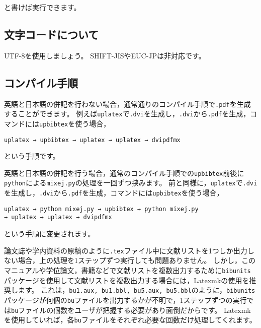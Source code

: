 \documentclass[10pt, a4paper, dvipdfmx, uplatex]{jsarticle} %
\begin{document}
\noindent\makebox[\linewidth]{\rule{\linewidth}{0.4pt}}\vspace{-0.5zw}
\begin{lstlisting}[style=onecol]

\end{lstlisting}\vspace{-1.8zw}
\noindent\makebox[\linewidth]{\rule{\linewidth}{0.4pt}}\vspace{0.5zw}\par
\noindent
と書けば実行できます。



\subsection{文字コードについて}

UTF-8を使用しましょう。
SHIFT-JISやEUC-JPは非対応です。


\subsection{コンパイル手順}
\label{sec:compile_procedure}

英語と日本語の併記を行わない場合，通常通りのコンパイル手順で\texttt{.pdf}を生成することができます。
例えば\texttt{uplatex}で\texttt{.dvi}を生成し，\texttt{.dvi}から\texttt{.pdf}を生成，\BibTeX コマンドには\texttt{upbibtex}を使う場合，
\begin{center}
\texttt{uplatex → upbibtex → uplatex → uplatex → dvipdfmx}
\end{center}
という手順です。

英語と日本語の併記を行う場合，通常のコンパイル手順での\texttt{upbibtex}前後に\texttt{python}による\texttt{mixej.py}の処理を一回ずつ挟みます。
前と同様に，\texttt{uplatex}で\texttt{.dvi}を生成し，\texttt{.dvi}から\texttt{.pdf}を生成，\BibTeX コマンドには\texttt{upbibtex}を使う場合，
\begin{center}
\texttt{uplatex → python mixej.py → upbibtex → python mixej.py\\→ uplatex → uplatex → dvipdfmx}
\end{center}
という手順に変更されます。

論文誌や学内資料の原稿のように\texttt{.tex}ファイル中に文献リストを1つしか出力しない場合，上の処理を1ステップずつ実行しても問題ありません。
しかし，このマニュアルや学位論文，書籍などで文献リストを複数出力するために\texttt{bibunits}パッケージを使用して文献リストを複数出力する場合には，Latexmkの使用を推奨します。
これは，\texttt{bu1.aux, bu1.bbl, bu5.aux, bu5.bbl}のように，\texttt{bibunits}パッケージが何個の\texttt{bu}ファイルを出力するかが不明で，1ステップずつの実行では\texttt{bu}ファイルの個数をユーザが把握する必要があり面倒だからです。
Latexmkを使用していれば，各\texttt{bu}ファイルをそれぞれ必要な回数だけ処理してくれます。
\end{document}
